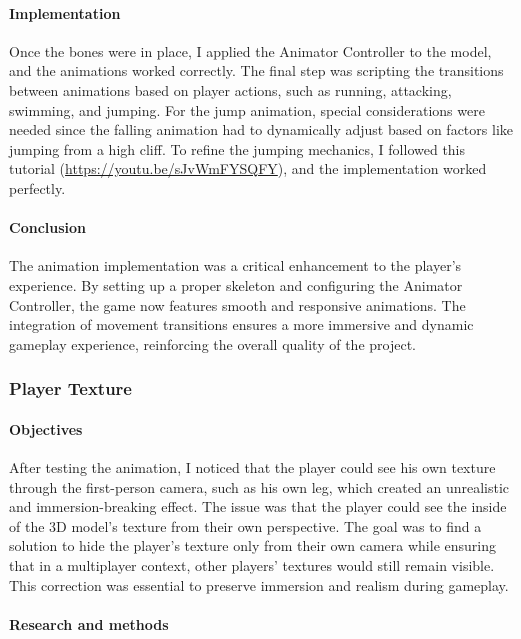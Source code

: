 \documentclass{article}
\begin{document}
\paragraph{Implementation}\hfill

Once the bones were in place, I applied the Animator Controller to the model, and the animations worked correctly. The final step was scripting the transitions between animations based on player actions, such as running, attacking, swimming, and jumping. For the jump animation, special considerations were needed since the falling animation had to dynamically adjust based on factors like jumping from a high cliff. To refine the jumping mechanics, I followed this tutorial (\url{https://youtu.be/sJvWmFYSQFY}), and the implementation worked perfectly.

\paragraph{Conclusion}\hfill

The animation implementation was a critical enhancement to the player's experience. By setting up a proper skeleton and configuring the Animator Controller, the game now features smooth and responsive animations. The integration of movement transitions ensures a more immersive and dynamic gameplay experience, reinforcing the overall quality of the project.


\subsubsection{Player Texture}
\paragraph{Objectives}\hfill

After testing the animation, I noticed that the player could see his own texture through the first-person camera, such as his own leg, which created an unrealistic and immersion-breaking effect. The issue was that the player could see the inside of the 3D model's texture from their own perspective. The goal was to find a solution to hide the player's texture only from their own camera while ensuring that in a multiplayer context, other players' textures would still remain visible. This correction was essential to preserve immersion and realism during gameplay.

\paragraph{Research and methods}\hfill
\end{document}
